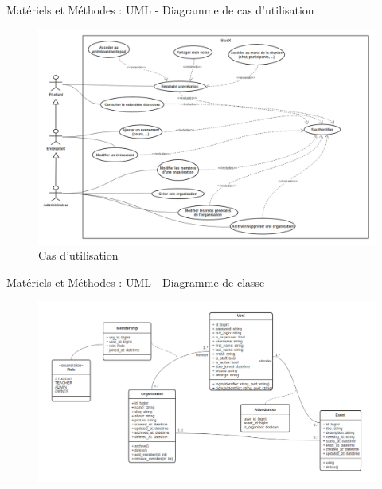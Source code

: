 \documentclass{beamer}
\begin{document}
\begin{frame}{Matériels et Méthodes : \small{UML} - \footnotesize{Diagramme de cas d'utilisation}}
  \begin{figure}[H]
    \centering
    \includegraphics[width=\textwidth]{../../images/use-cases-diag.png}
    \caption{Cas d'utilisation}
\end{figure}

\end{frame}

\begin{frame}{Matériels et Méthodes : \small{UML} - \footnotesize{Diagramme de classe}}
  \begin{figure}[H]
    \centering
    \includegraphics[width=\textwidth]{../../images/class-diag.png}
\end{figure}
\end{frame}
\end{document}
